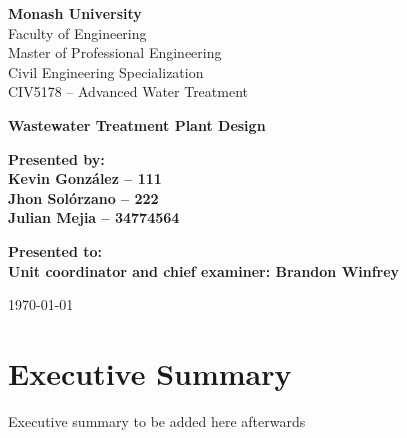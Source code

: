 \documentclass[12pt]{article}
\begin{document}
\pagestyle{empty}

\begin{titlepage}
  \thispagestyle{empty}  %
  
  \begin{flushleft}
  \textbf{Monash University}\\
  Faculty of Engineering\\
  Master of Professional Engineering\\
  Civil Engineering Specialization\\
  CIV5178 – Advanced Water Treatment
  \end{flushleft}
  
  \vspace{2cm}
  
  \begin{center}
      {\Huge \bfseries Wastewater Treatment Plant Design \\[0.5cm]}
  
      \vspace{1.5cm}
  
      {\large \bfseries
      Presented by:\\
      Kevin González – 111\\
      Jhon Solórzano – 222\\
      Julian Mejia – 34774564
      }
  
      \vspace{1cm}
  
      {\large \bfseries
      Presented to:\\
      Unit coordinator and chief examiner: Brandon Winfrey
      }
  \end{center}
  
  \vfill
  
  \begin{center}
      {\normalsize \today}
  \end{center}
  \end{titlepage}
  

\section*{Executive Summary}
Executive summary to be added here afterwards
\newpage


\tableofcontents
\newpage

\pagestyle{fancy}
\setcounter{page}{1}
\end{document}
